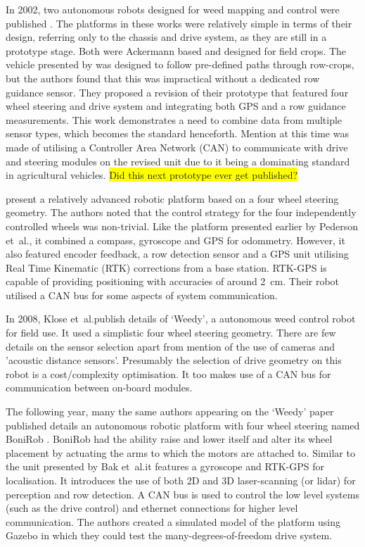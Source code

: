 \documentclass[preprint,authoryear,12pt]{elsarticle}
\begin{document}
        In 2002, two autonomous robots designed for weed mapping and control were published \citep{Pedersen2002,Astrand2002}.
        The platforms in these works were relatively simple in terms of their design, referring only to the chassis and drive system, as they are still in a prototype stage.
        Both were Ackermann based and designed for field crops.
        The vehicle presented by \cite{Pedersen2002} was designed to follow pre-defined paths through row-crops, but the authors found that this was impractical without a dedicated row guidance sensor.
        They proposed a revision of their prototype that featured four wheel steering and drive system and integrating both GPS and a row guidance measurements.
        This work demonstrates a need to combine data from multiple sensor types, which becomes the standard henceforth.
        Mention at this time was made of utilising a Controller Area Network (CAN) to communicate with drive and steering modules on the revised unit due to it being a dominating standard in agricultural vehicles.
        \colorbox{yellow}{Did this next prototype ever get published?}
        
        \cite{Bak2004} present a relatively advanced robotic platform based on a four wheel steering geometry.
        The authors noted that the control strategy for the four independently controlled wheels was non-trivial.
        Like the platform presented earlier by Pederson et~al.\@, it combined a compass, gyroscope and GPS for odommetry.
        However, it also featured encoder feedback, a row detection sensor and a GPS unit utilising Real Time Kinematic (RTK) corrections from a base station.
        RTK-GPS is capable of providing positioning with accuracies of around \SI{2}{\centi\meter}.
        Their robot utilised a CAN bus for some aspects of system communication.

        In 2008, Klose et~al.\@ publish details of `Weedy', a autonomous weed control robot for field use.
        It used a simplistic four wheel steering geometry.
        There are few details on the sensor selection apart from mention of the use of cameras and 'acoustic distance sensors'.
        Presumably the selection of drive geometry on this robot is a cost/complexity optimisation.
        It too makes use of a CAN bus for communication between on-board modules.

        The following year, many the same authors appearing on the `Weedy' paper published details an autonomous robotic platform with four wheel steering named BoniRob \citep{Ruckelshausen2009}.
        BoniRob had the ability raise and lower itself and alter its wheel placement by actuating the arms to which the motors are attached to.
        Similar to the unit presented by Bak et~al.\@ it features a gyroscope and RTK-GPS for localisation.
        It introduces the use of both 2D and 3D laser-scanning (or lidar) for perception and row detection.
        A CAN bus is used to control the low level systems (such as the drive control) and ethernet connections for higher level communication.
        The authors created a simulated model of the platform using Gazebo in which they could test the many-degrees-of-freedom drive system.
\end{document}
